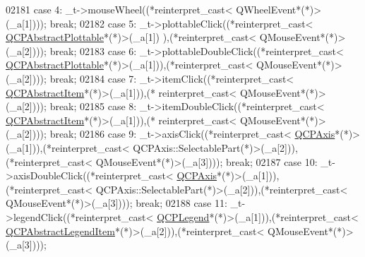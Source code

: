 \begin{DoxyCode}
02181         \textcolor{keywordflow}{case} 4: \_t->mouseWheel((*\textcolor{keyword}{reinterpret\_cast<} QWheelEvent*(*)\textcolor{keyword}{>}(\_a[1]))); \textcolor{keywordflow}{break};
02182         \textcolor{keywordflow}{case} 5: \_t->plottableClick((*\textcolor{keyword}{reinterpret\_cast<} \hyperlink{a00024}{QCPAbstractPlottable}*(*)\textcolor{keyword}{>}(\_a[1])
      ),(*\textcolor{keyword}{reinterpret\_cast<} QMouseEvent*(*)\textcolor{keyword}{>}(\_a[2]))); \textcolor{keywordflow}{break};
02183         \textcolor{keywordflow}{case} 6: \_t->plottableDoubleClick((*\textcolor{keyword}{reinterpret\_cast<} 
      \hyperlink{a00024}{QCPAbstractPlottable}*(*)\textcolor{keyword}{>}(\_a[1])),(*\textcolor{keyword}{reinterpret\_cast<} QMouseEvent*(*)\textcolor{keyword}{>}(\_a[2]))); \textcolor{keywordflow}{break};
02184         \textcolor{keywordflow}{case} 7: \_t->itemClick((*\textcolor{keyword}{reinterpret\_cast<} \hyperlink{a00022}{QCPAbstractItem}*(*)\textcolor{keyword}{>}(\_a[1])),(*\textcolor{keyword}{
      reinterpret\_cast<} QMouseEvent*(*)\textcolor{keyword}{>}(\_a[2]))); \textcolor{keywordflow}{break};
02185         \textcolor{keywordflow}{case} 8: \_t->itemDoubleClick((*\textcolor{keyword}{reinterpret\_cast<} \hyperlink{a00022}{QCPAbstractItem}*(*)\textcolor{keyword}{>}(\_a[1])),(*\textcolor{keyword}{
      reinterpret\_cast<} QMouseEvent*(*)\textcolor{keyword}{>}(\_a[2]))); \textcolor{keywordflow}{break};
02186         \textcolor{keywordflow}{case} 9: \_t->axisClick((*\textcolor{keyword}{reinterpret\_cast<} \hyperlink{a00025}{QCPAxis}*(*)\textcolor{keyword}{>}(\_a[1])),(*\textcolor{keyword}{reinterpret\_cast<} 
      QCPAxis::SelectablePart(*)\textcolor{keyword}{>}(\_a[2])),(*\textcolor{keyword}{reinterpret\_cast<} QMouseEvent*(*)\textcolor{keyword}{>}(\_a[3]))); \textcolor{keywordflow}{break};
02187         \textcolor{keywordflow}{case} 10: \_t->axisDoubleClick((*\textcolor{keyword}{reinterpret\_cast<} \hyperlink{a00025}{QCPAxis}*(*)\textcolor{keyword}{>}(\_a[1])),(*\textcolor{keyword}{reinterpret\_cast<} 
      QCPAxis::SelectablePart(*)\textcolor{keyword}{>}(\_a[2])),(*\textcolor{keyword}{reinterpret\_cast<} QMouseEvent*(*)\textcolor{keyword}{>}(\_a[3]))); \textcolor{keywordflow}{break};
02188         \textcolor{keywordflow}{case} 11: \_t->legendClick((*\textcolor{keyword}{reinterpret\_cast<} \hyperlink{a00045}{QCPLegend}*(*)\textcolor{keyword}{>}(\_a[1])),(*\textcolor{keyword}{reinterpret\_cast<} 
      \hyperlink{a00023}{QCPAbstractLegendItem}*(*)\textcolor{keyword}{>}(\_a[2])),(*\textcolor{keyword}{reinterpret\_cast<} QMouseEvent*(*)\textcolor{keyword}{>}(\_a[3]))); \textcolor{keywordflow}{
}
\end{DoxyCode}
